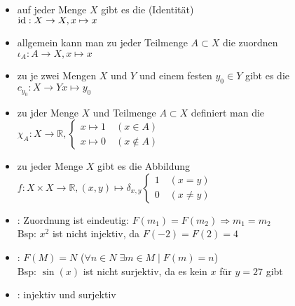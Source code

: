 \begin{example}
	\begin{itemize}
		\item auf jeder Menge $X$ gibt es die  (Identität) \\ $\operatorname{id}: X \to X, x 
		\mapsto x$
		\item allgemein kann man zu jeder Teilmenge $A \subset X$ die  zuordnen
		$\iota_A: A \to X, x \mapsto x$
		\item zu je zwei Mengen $X$ und $Y$ und einem festen $y_0 \in Y$ gibt es die  $c_{y_0}: X \to Y x \mapsto y_0$
		\item zu jder Menge $X$ und Teilmenge $A \subset X$ definiert man die \\ $\chi_A: X \to \mathbb R,
		\begin{cases}
		x \mapsto 1 \quad(x \in A) \\ x \mapsto 0 \quad(x \notin A)
		\end{cases}
		$
		\item zu jeder Menge $X$ gibt es die Abbildung \\ $f: X \times X \to \mathbb R, (x,y) \mapsto
		\delta_{x,y} \begin{cases} 1 \quad (x=y) \\ 0 \quad (x \neq y) \end{cases}$
	\end{itemize}
\end{example}

\begin{example}
	\begin{itemize}
		\item {}: Zuordnung ist eindeutig: $F(m_1) = F(m_2) \Rightarrow m_1=m_2$ \\
		Bsp: $x^2$ ist nicht injektiv, da $F(-2)=F(2)=4$
		\item {}: $F(M)=N$ ($\forall n \in N \; \exists m \in M \mid F(m)=n$) \\
		Bsp: $\sin(x)$ ist nicht surjektiv, da es kein $x$ für $y=27$ gibt
		\item {}: injektiv und surjektiv
	\end{itemize}
\end{example}


